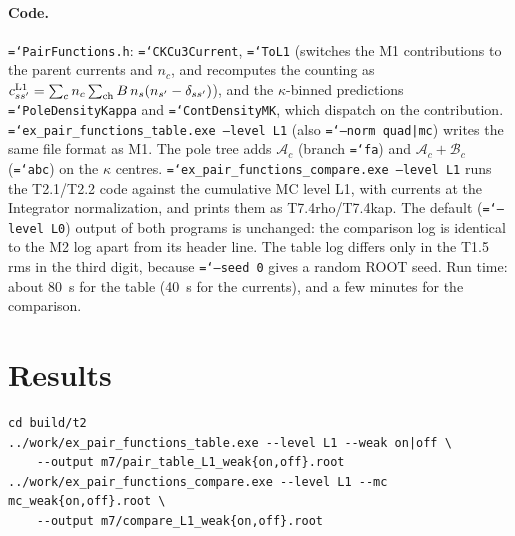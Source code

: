 \documentclass[11pt,a4paper]{article}
\newcommand{\code}[1]{\texttt{\hyphenchar\font=`\-#1}}
\begin{document}
\paragraph{Code.} \code{PairFunctions.h}: \code{CKCu3Current}, \code{ToL1} (switches the M1
contributions to the parent currents and $n_c$, and recomputes the counting as
$c^{\rm L1}_{ss'}=\sum_cn_c\sum_{\rm ch}B\,n_s(n_{s'}-\delta_{ss'})$), and the $\kappa$-binned
predictions \code{PoleDensityKappa} and \code{ContDensityMK}, which dispatch on the contribution.
\code{ex\_pair\_functions\_table.exe --level L1} (also \code{--norm quad|mc}) writes the same file
format as M1. The pole tree adds $\mathcal A_c$ (branch \code{fa}) and $\mathcal A_c+\mathcal B_c$
(\code{abc}) on the $\kappa$ centres. \code{ex\_pair\_functions\_compare.exe --level L1} runs the
T2.1/T2.2 code against the cumulative MC level L1, with currents at the Integrator normalization, and
prints them as T7.4rho/T7.4kap. The default (\code{--level L0}) output of both programs is unchanged:
the comparison log is identical to the M2 log apart from its header line. The table log differs only
in the T1.5 rms in the third digit, because \code{--seed 0} gives a random ROOT seed.
Run time: about 80~s for the table (40~s for the currents), and a few minutes for the comparison.

\section{Results}
\begin{verbatim}
cd build/t2
../work/ex_pair_functions_table.exe --level L1 --weak on|off \
    --output m7/pair_table_L1_weak{on,off}.root
../work/ex_pair_functions_compare.exe --level L1 --mc mc_weak{on,off}.root \
    --output m7/compare_L1_weak{on,off}.root
\end{verbatim}
\end{document}
